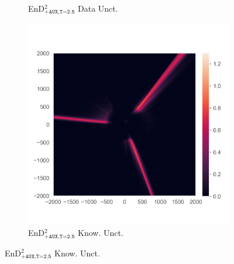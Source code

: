 \begin{figure}
\begin{subfigure}{0.22\textwidth}
  \caption{EnD$^2_{\texttt{+AUX,T=2.5}}$ Data Unct.}
  \label{fig:3n}
\end{subfigure}%
\begin{subfigure}{0.22\textwidth}
  \centering
  \includegraphics[trim=42 45 15 55, clip, width=\linewidth]{../openreview/plots/3o.png}
  \caption{EnD$^2_{\texttt{+AUX,T=2.5}}$ Know. Unct.}
  \label{fig:3o}
\end{subfigure}%


\end{figure}
